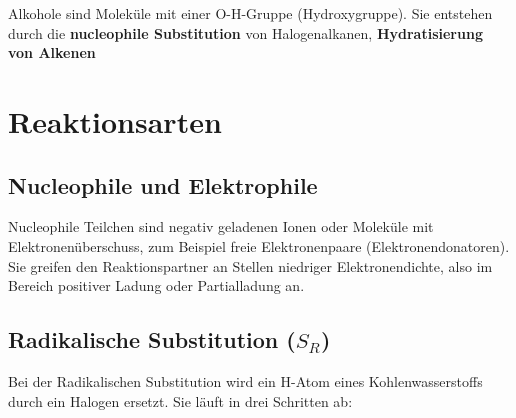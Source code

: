 \documentclass[a4paper]{article}
\begin{document}
Alkohole sind Moleküle mit einer O-H-Gruppe (Hydroxygruppe). Sie entstehen durch die
\textbf{nucleophile Substitution} von Halogenalkanen, \textbf{Hydratisierung von Alkenen}








\section{Reaktionsarten}

\subsection{Nucleophile und Elektrophile}
Nucleophile Teilchen sind negativ geladenen Ionen oder Moleküle mit Elektronenüberschuss, zum Beispiel freie Elektronenpaare (Elektronendonatoren).
Sie greifen den Reaktionspartner an Stellen niedriger Elektronendichte, also im Bereich positiver Ladung oder Partialladung an.

\subsection{Radikalische Substitution ($S_R$)}

Bei der Radikalischen Substitution wird ein H-Atom eines Kohlenwasserstoffs durch ein Halogen ersetzt.
Sie läuft in drei Schritten ab:\\
\end{document}
